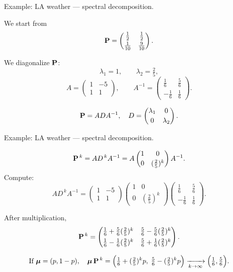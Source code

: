 \documentclass[aspectratio=169]{beamer}
\begin{document}
\begin{frame}{Example: LA weather — spectral decomposition.}

We start from
\[
\mathbf{P}=
\begin{pmatrix}
\frac12 & \frac12\\[2pt]
\frac1{10} & \frac9{10}
\end{pmatrix}.
\]

We diagonalize \(\mathbf{P}\):
\[
\lambda_1=1,\qquad \lambda_2=\tfrac25,
\]
\[
A=\begin{pmatrix}1 & -5\\[2pt]1 & 1\end{pmatrix},
\qquad
A^{-1}=\begin{pmatrix}\tfrac16 & \tfrac56\\[2pt]-\tfrac16 & \tfrac16\end{pmatrix}.
\]

\[
\mathbf{P} = A D A^{-1},
\quad
D=\begin{pmatrix}\lambda_1 & 0\\[2pt]0 & \lambda_2\end{pmatrix}.
\]

\end{frame}




\begin{frame}{Example: LA weather — spectral decomposition.}


\[
\mathbf{P}^{\,k} = A D^{\,k} A^{-1}
= A
\begin{pmatrix}1 & 0\\[2pt]0 & (\tfrac25)^{k}\end{pmatrix}
A^{-1}.
\]
Compute:
\[
A D^{\,k} A^{-1}
=
\begin{pmatrix}1 & -5\\[2pt]1 & 1\end{pmatrix}
\begin{pmatrix}1 & 0\\[2pt]0 & (\tfrac25)^k\end{pmatrix}
\begin{pmatrix}\tfrac16 & \tfrac56\\[2pt]-\tfrac16 & \tfrac16\end{pmatrix}.
\]

After multiplication,
\[
\mathbf{P}^{\,k} =
\begin{pmatrix}
\frac16+\frac56(\tfrac25)^k & \frac56-\frac56(\tfrac25)^k\\[4pt]
\frac16-\frac16(\tfrac25)^k & \frac56+\frac16(\tfrac25)^k
\end{pmatrix}.
\]

\[
\text{If }\mbox{\boldmath $\mu$}=(p,1-p),\quad
\mbox{\boldmath $\mu$}\,\mathbf{P}^{\,k}=
\Bigl(
\tfrac16+(\tfrac25)^k p,\;
\tfrac56-(\tfrac25)^k p
\Bigr)
\xrightarrow[k\to\infty]{}
\Bigl(\tfrac16,\tfrac56\Bigr).
\]

\end{frame}
\end{document}
